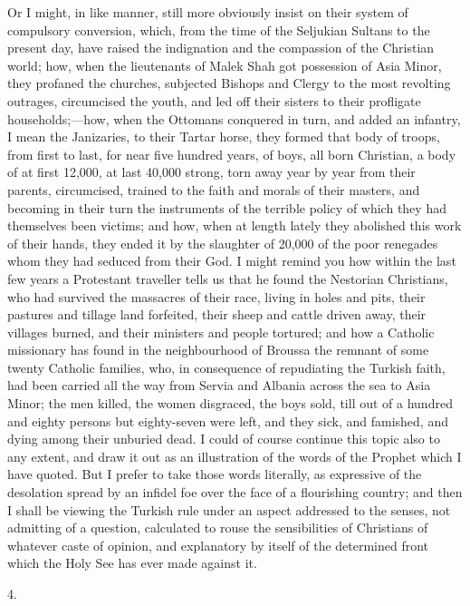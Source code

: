 Or I might, in like manner,
still more obviously insist on their system of compulsory conversion,
which, from the time of the Seljukian Sultans to the present day, have
raised the indignation and the compassion of the Christian world; how,
when the lieutenants of Malek Shah got possession of Asia Minor, they
profaned the churches, subjected Bishops and Clergy to the most
revolting outrages, circumcised the youth, and led off their sisters
to their profligate households;—how, when the Ottomans conquered in
turn, and added an infantry, I mean the Janizaries, to their
Tartar horse, they formed that body of troops, from first to last, for
near five hundred years, of boys, all born Christian, a body of at
first 12,000, at last 40,000 strong, torn away year by year from their
parents, circumcised, trained to the faith and morals of their
masters, and becoming in their turn the instruments of the terrible
policy of which they had themselves been victims; and how, when at
length lately they abolished this work of their hands, they ended it
by the slaughter of 20,000 of the poor renegades whom they had seduced
from their God. I might remind you how within the last few years a
Protestant traveller tells us that he found the Nestorian Christians,
who had survived the massacres of their race, living in holes and
pits, their pastures and tillage land forfeited, their sheep and
cattle driven away, their villages burned, and their ministers and
people tortured; and how a Catholic missionary has found in the
neighbourhood of Broussa the remnant of some twenty Catholic families,
who, in consequence of repudiating the Turkish faith, had been carried
all the way from Servia and Albania across the sea to Asia Minor; the
men killed, the women disgraced, the boys sold, till out of a hundred
and eighty persons but eighty-seven were left, and they sick, and
famished, and dying among their unburied dead. I could of course
continue this topic also to any extent, and draw it out as an
illustration of the words of the Prophet which I have quoted. But I
prefer to take those words literally, as expressive of the desolation
spread by an infidel foe over the face of a flourishing country; and
then I shall be viewing the Turkish rule under an aspect addressed to
the senses, not admitting of a question, calculated to rouse the
sensibilities of Christians of whatever caste of opinion, and
explanatory by itself of the determined front which the Holy See
has ever made against it.

4.

